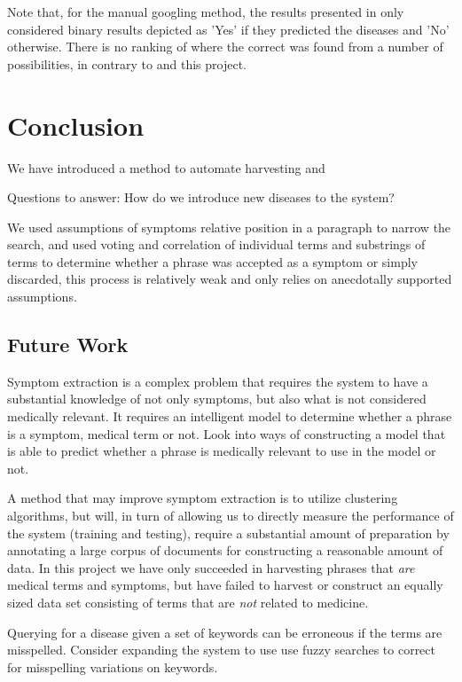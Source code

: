 \documentclass[10pt,letterpaper,final]{article}
\begin{document}
Note that, for the manual googling method, the results presented in
\cite{googlingdiagnosis} only considered binary results depicted as
'Yes' if they predicted the diseases and 'No' otherwise. There is no
ranking of where the correct was found from a number of possibilities,
in contrary to \cite{jensenandersen} and this project.




\section{Conclusion}
\label{chap:conclusion}
We have introduced a method to automate harvesting and 

Questions to answer: How do we introduce new diseases to the system?



We used assumptions of
symptoms relative position in a paragraph to narrow the search, and used
voting and correlation of individual terms and substrings of terms to
determine whether a phrase was accepted as a symptom or simply
discarded, this process is relatively weak and only relies on
anecdotally supported assumptions.


\subsection{Future Work}
Symptom extraction is a complex problem that requires the system to have
a substantial knowledge of not only symptoms, but also what is not
considered medically relevant. It requires an intelligent model to
determine whether a phrase is a symptom, medical term or not. Look into
ways of constructing a model that is able to predict whether a phrase
is medically relevant to use in the model or not.

A method that may improve symptom extraction is to utilize clustering
algorithms, but will, in turn of allowing us to directly measure the
performance of the system (training and testing), require a substantial
amount of preparation by annotating a large corpus of documents for
constructing a reasonable amount of data. In this project we have only
succeeded in harvesting phrases that \textit{are} medical terms and
symptoms, but have failed to harvest or construct an equally sized data
set consisting of terms that are \textit{not} related to medicine.

Querying for a disease given a set of keywords can be erroneous if the
terms are misspelled. Consider expanding the system to use use fuzzy
searches to correct for misspelling variations on keywords.
\end{document}
